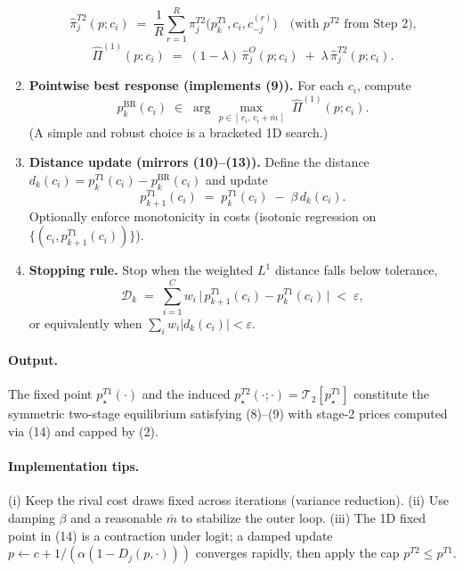 \documentclass[12pt]{article}
\begin{document}
\begin{enumerate}
  \[
  \widehat{\pi}^{T2}_j(p;c_i)
  \;=\;
  \frac{1}{R}\sum_{r=1}^R \pi^{T2}_j\bigl(p^{T1}_k, c_i, c^{(r)}_{-j}\bigr)
  \quad\text{(with $p^{T2}$ from Step 2),}
  \]
  \[
  \widehat{\Pi}^{(1)}(p;c_i)
  \;=\;
  (1-\lambda)\,\widehat{\pi}^{O}_j(p;c_i)
  \;+\; \lambda\,\widehat{\pi}^{T2}_j(p;c_i).
  \]

  \item \textbf{Pointwise best response (implements (9)).}
  For each $c_i$, compute
  \[
    p^{\mathrm{BR}}_k(c_i)
    \;\in\; \arg\max_{\,p \in [\,c_i,\,c_i+\bar m\,]}\;\widehat{\Pi}^{(1)}(p;c_i).
  \]
  (A simple and robust choice is a bracketed 1D search.)

  \item \textbf{Distance update (mirrors (10)–(13)).}
  Define the distance $d_k(c_i)=p^{T1}_k(c_i)-p^{\mathrm{BR}}_k(c_i)$ and update
  \[
    p^{T1}_{k+1}(c_i) \;=\; p^{T1}_{k}(c_i) \;-\; \beta\, d_k(c_i).
  \]
  Optionally enforce monotonicity in costs (isotonic regression on $\{(c_i,p^{T1}_{k+1}(c_i))\}$).

  \item \textbf{Stopping rule.}
  Stop when the weighted $L^1$ distance falls below tolerance,
  \[
    \mathcal{D}_k \;=\; \sum_{i=1}^C w_i\,\bigl|\,p^{T1}_{k+1}(c_i)-p^{T1}_{k}(c_i)\,\bigr|
    \;<\; \varepsilon,
  \]
  or equivalently when $\sum_i w_i |d_k(c_i)|<\varepsilon$.
\end{enumerate}

\paragraph{Output.} The fixed point $p^{T1}_\star(\cdot)$ and the induced
$p^{T2}_\star(\cdot;\cdot)=\mathcal{T}_2[p^{T1}_\star]$ constitute the symmetric two-stage equilibrium
satisfying (8)–(9) with stage-2 prices computed via (14) and capped by (2).

\paragraph{Implementation tips.}
(i) Keep the rival cost draws fixed across iterations (variance reduction).
(ii) Use damping $\beta$ and a reasonable $\bar m$ to stabilize the outer loop.
(iii) The 1D fixed point in (14) is a contraction under logit; a damped update $p\leftarrow
c + 1/(\alpha(1-D_j(p,\cdot)))$ converges rapidly, then apply the cap $p^{T2}\le p^{T1}$.






 
\end{document}

